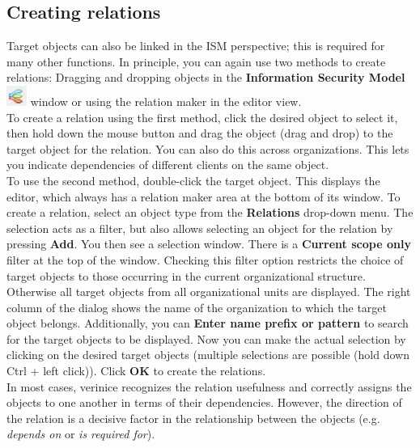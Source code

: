 \documentclass[a4paper,10pt]{book}
\begin{document}
\subsection{Creating relations}
\label{sec:ismView_dd}
Target objects can also be linked in the ISM perspective; this is required for many other functions. In principle, you can again use two methods to create relations:
Dragging and dropping objects in the
\textbf{Information Security Model} \includegraphics[height=2ex]{Icon/Informationssicherheitsmodell.png}
window or using the relation maker in the editor view.
\newline\\
To create a relation using the first method, click the desired object to select it, then hold down
the mouse button and drag the object (drag and drop) to the target object for the relation. You can
also do this across organizations. This lets you indicate dependencies of different clients on
the same object.
\newline\\
To use the second method, double-click the target object. This displays the editor, which always has a relation maker area at the bottom of its window.
To create a relation, select an object type from the \textbf{Relations}
drop-down menu. The selection acts as a filter, but also allows selecting an object for the relation by pressing
\textbf{Add}. You then see a selection window. There is a \textbf{Current scope only} filter at the top of the window. Checking this filter option restricts
the choice of target objects to those occurring in the current organizational structure. Otherwise all target
objects from all organizational units are displayed. The right column of the dialog shows the name of the organization to which the target object belongs. Additionally, you can \textbf{Enter name prefix or pattern}
to search for the target objects to be displayed. Now you can make the actual selection by clicking on the desired target objects (multiple selections
are possible (hold down Ctrl + left click)). Click \textbf{OK} to create the relations.
\newline\\
In most cases, verinice recognizes the relation usefulness and correctly assigns the objects to one another in terms of their dependencies. However,
the direction of the relation is a decisive factor in the relationship between the objects (e.g. {\em depends on} or
{\em is required for}).
\end{document}
